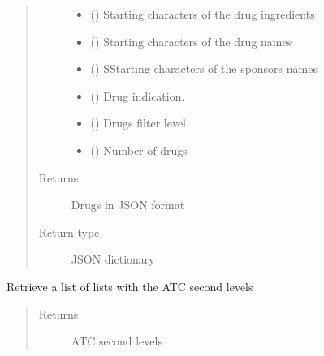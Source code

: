 \documentclass[letterpaper,10pt,english]{sphinxmanual}
\begin{document}
\begin{fulllineitems}
\begin{fulllineitems}
\begin{quote}
\begin{description}
\begin{itemize}
\item {} 
\sphinxAtStartPar
{} () \textendash{} Starting characters of the drug ingredients

\item {} 
\sphinxAtStartPar
{} () \textendash{} Starting characters of the drug names

\item {} 
\sphinxAtStartPar
{} () \textendash{} SStarting characters of the sponsors names

\item {} 
\sphinxAtStartPar
{} () \textendash{} Drug indication.

\item {} 
\sphinxAtStartPar
{} () \textendash{} Drugs filter level

\item {} 
\sphinxAtStartPar
{} () \textendash{} Number of drugs

\end{itemize}

\item[{Returns}] \leavevmode
\sphinxAtStartPar
Drugs in JSON format

\item[{Return type}] \leavevmode
\sphinxAtStartPar
JSON dictionary

\end{description}\end{quote}

\end{fulllineitems}


\begin{fulllineitems}
\label{\detokenize{CE_app.synth_phr:CE_app.synth_phr.functions.Domains.drugs_atc_second_levels}}
\sphinxAtStartPar
Retrieve a list of lists with the ATC second levels
\begin{quote}\begin{description}
\item[{Returns}] \leavevmode
\sphinxAtStartPar
ATC second levels


\end{description}
\end{quote}
\end{fulllineitems}
\end{fulllineitems}
\end{document}
